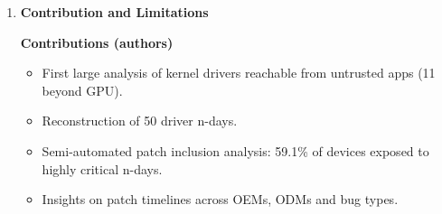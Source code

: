 \documentclass[11pt,a4paper]{article}
\newcommand{\entrypart}[1]{\textbf{\color{accent}#1}\par\vspace{2pt}}
\begin{document}
\begin{enumerate}
    \begin{itemize}
        \item \textbf{Attack surface:} besides GPUs, 11 drivers reachable from untrusted apps, e.g., DSP (\texttt{/dev/adsprpc-smd}), JPEG decoder, AI/NPU, GED, perf monitor, secure memory. Static results matched runtime on all tested devices.
        \item \textbf{N-days:} 50 vulnerabilities. Most common UAF (16), then ID (14), Others (11), OOB write (9). \texttt{frpc-adsprpc.ko} has 19.
        \item \textbf{Susceptibility:} 61.4\% of devices have at least one n-day. 59.1\% have at least one highly critical (UAF/OOB).
        \begin{itemize}
            \item Samsung 45.5\%, Xiaomi 71.4\% (74.1\% and 79.5\% when counting only devices with the target drivers).
            \item 29.5\% of Samsung and 49\% of Xiaomi devices have 3 or more n-days.
        \end{itemize}
        \item \textbf{Patch delay (lower bound):} up to 830 days. UAF/OOB can take over 500 days, ID over 800 days.
        \begin{itemize}
            \item MediaTek over 2 times slower than Qualcomm (e.g., UAF about 4 months vs over 8 months).
            \item Samsung usually faster than Xiaomi.
        \end{itemize}
        \item \textbf{Practice:} OEMs mostly fix flaws by releasing new devices, not by updating old ones (strongest for Xiaomi).
        \item \textbf{PoCs:} reusable across OEMs. Samsung patched in 0--7 months. All tested Xiaomi and Asus releases still vulnerable at analysis time.
        \item \textbf{Disclosure:} Samsung started patching. Asus, Realme, MediaTek acknowledged. Google said it is out of scope and referred them to OEMs.
    \end{itemize}

    \item \entrypart{Contribution and Limitations}

    \textbf{Contributions (authors)}
    \begin{itemize}
        \item First large analysis of kernel drivers reachable from untrusted apps (11 beyond GPU).
        \item Reconstruction of 50 driver n-days.
        \item Semi-automated patch inclusion analysis: 59.1\% of devices exposed to highly critical n-days.
        \item Insights on patch timelines across OEMs, ODMs and bug types.
    \end{itemize}


\end{enumerate}
\end{document}
